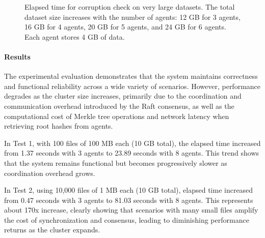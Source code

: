 \begin{figure}[!ht]
\centering
{}
\caption{Elapsed time for corruption check on very large datasets. The total dataset size increases
    with the number of agents: 12 GB for 3 agents, 16 GB for 4 agents, 20 GB
    for 5 agents, and 24 GB for 6 agents. Each agent stores 4 GB of data.}
\label{fig:test-5}
\end{figure}

\newpage

\paragraph{Results}

The experimental evaluation demonstrates that the system maintains correctness and functional reliability across a wide variety of scenarios. However, performance degrades as the cluster size increases, primarily due to the coordination and communication overhead introduced by the Raft consensus, as well as the computational cost of Merkle tree operations and network latency when retrieving root hashes from agents.

In Test 1, with 100 files of 100 MB each (10 GB total), the elapsed time
increased from 1.37 seconds with 3 agents to 23.89 seconds with 8 agents. This trend shows that the system remains functional but becomes progressively slower as coordination overhead grows.

In Test 2, using 10,000 files of 1 MB each (10 GB total), elapsed time increased
from 0.47 seconds with 3 agents to 81.03 seconds with 8 agents. This represents about
170x increase, clearly showing that scenarios with many small files amplify the cost of synchronization and consensus, leading to diminishing performance returns as the cluster expands.


